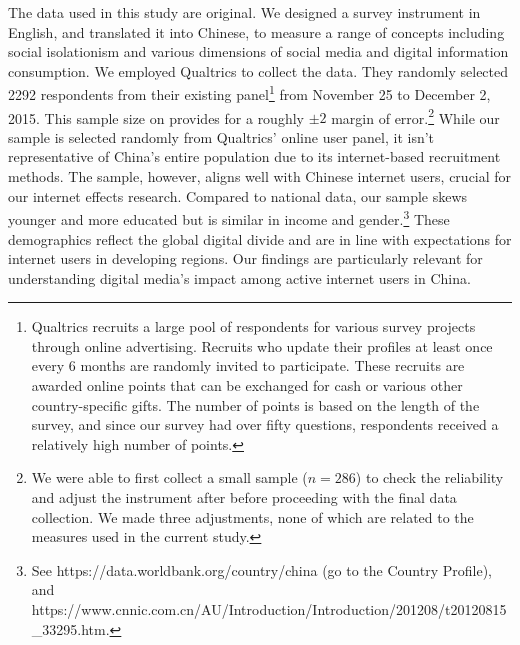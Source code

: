\documentclass[
  letterpaper,
  DIV=11,
  numbers=noendperiod]{scrartcl}
\begin{document}
The data used in this study are original. We designed a survey
instrument in English, and translated it into Chinese, to measure a
range of concepts including social isolationism and various dimensions
of social media and digital information consumption. We employed
Qualtrics to collect the data. They randomly selected 2292 respondents
from their existing panel\footnote{Qualtrics recruits a large pool of
  respondents for various survey projects through online advertising.
  Recruits who update their profiles at least once every 6 months are
  randomly invited to participate. These recruits are awarded online
  points that can be exchanged for cash or various other
  country-specific gifts. The number of points is based on the length of
  the survey, and since our survey had over fifty questions, respondents
  received a relatively high number of points.} from November 25 to
December 2, 2015. This sample size on provides for a roughly \(\pm2\)
margin of error.\footnote{We were able to first collect a small sample
  (\(n=286\)) to check the reliability and adjust the instrument after
  before proceeding with the final data collection. We made three
  adjustments, none of which are related to the measures used in the
  current study.} While our sample is selected randomly from Qualtrics'
online user panel, it isn't representative of China's entire population
due to its internet-based recruitment methods. The sample, however,
aligns well with Chinese internet users, crucial for our internet
effects research. Compared to national data, our sample skews younger
and more educated but is similar in income and gender.\footnote{See
  https://data.worldbank.org/country/china (go to the Country Profile),
  and
  https://www.cnnic.com.cn/AU/Introduction/Introduction/201208/t20120815\_33295.htm.}
These demographics reflect the global digital divide and are in line
with expectations for internet users in developing regions. Our findings
are particularly relevant for understanding digital media's impact among
active internet users in China.
\end{document}
